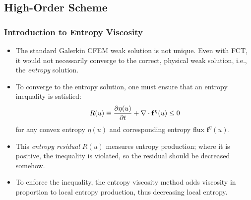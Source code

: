 \documentclass{beamer} \useoutertheme{infolines}
\begin{document}
\subsection{High-Order Scheme}
\begin{frame}
\frametitle{Introduction to Entropy Viscosity}

\begin{itemize}
   \item The standard Galerkin CFEM weak solution is not unique. Even with
      FCT, it would not necessarily converge to the correct, physical
      weak solution, i.e., the \emph{entropy} solution.
   \item To converge to the entropy solution, one must ensure that an entropy
      inequality is satisfied:
      \begin{equation}
         R(u) \equiv \frac{\partial \eta(u)}{\partial t} + \nabla\cdot\mathbf{f}^\eta(u) \leq 0
      \end{equation}
      for any convex entropy $\eta(u)$ and corresponding entropy flux
      $\mathbf{f}^\eta(u)$.
   \item This \emph{entropy residual} $R(u)$ measures entropy production;
      where it is positive, the inequality is violated, so the residual
      should be decreased somehow.
   \item To enforce the inequality, the entropy viscosity method adds
      viscosity in proportion to local entropy production, thus decreasing
      local entropy.
\end{itemize}

\end{frame}
\end{document}
